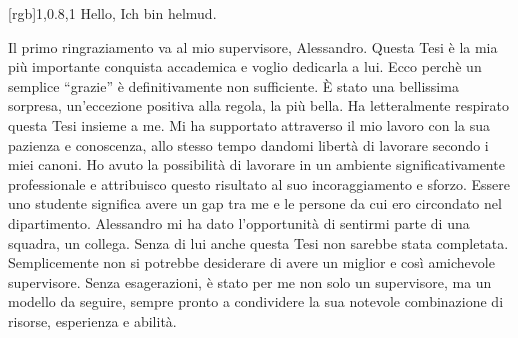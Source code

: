 \documentclass{article}
\begin{document}
\begin{paracol}{2}
[rgb]{1,0.8,1}
Hello, Ich bin helmud.
\lipsum
    \switchcolumn

    Il primo ringraziamento va al mio supervisore, Alessandro. Questa Tesi \`e la mia pi\`u importante conquista accademica e voglio dedicarla a lui. Ecco perch\`e un semplice ``grazie'' \`e definitivamente non sufficiente. \`E stato una bellissima sorpresa, un'eccezione positiva alla regola, la pi\`u bella. Ha letteralmente respirato questa Tesi insieme a me. Mi ha supportato attraverso il mio lavoro con la sua pazienza e conoscenza, allo stesso tempo dandomi libert\`a di lavorare secondo i miei canoni. Ho avuto la possibilit\`a di lavorare in un ambiente significativamente professionale e attribuisco questo risultato al suo incoraggiamento e sforzo. Essere uno studente significa avere un gap tra me e le persone da cui ero circondato nel dipartimento. Alessandro mi ha dato l'opportunit\`a di sentirmi parte di una squadra, un collega. Senza di lui anche questa Tesi non sarebbe stata completata. Semplicemente non si potrebbe desiderare di avere un miglior e cos\`i amichevole supervisore. Senza esagerazioni, \`e stato per me non solo un supervisore, ma un modello da seguire, sempre pronto a condividere la sua notevole combinazione di risorse, esperienza e abilit\`a.

  \end{paracol}
\end{document}
